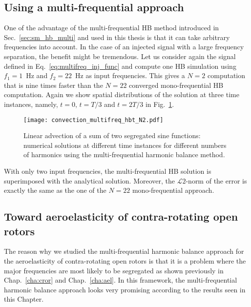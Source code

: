 \subsection{Using a multi-frequential approach}

One of the advantage of the multi-frequential HB method introduced in Sec.~\ref{sec:sm_hb_multi}
and used in this thesis is that it can take arbitrary frequencies into account.
In the case of an injected signal with a large frequency separation, the
benefit might be tremendous. Let us consider again the signal defined in 
Eq.~\eqref{eq:multifreq_inj_func} and compute one HB simulation using 
$f_1=1$~Hz and $f_2=22$~Hz as input frequencies. This gives a $N=2$
computation that is nine times faster than the $N=22$ converged mono-frequential
HB computation.
Again
we show spatial distributions of the solution
at three time instances, namely, $t=0$, $t=T/3$ and $t=2T/3$
in Fig.~\ref{fig:inj_multifreq_hb}.
\begin{figure}[htb]
  \centering
  \texttt{[image: convection\_multifreq\_hbt\_N2.pdf]}
  \caption{Linear advection of a sum of two segregated sine functions: 
  numerical solutions at different time instances for different numbers of harmonics using the
  multi-frequential harmonic balance method.}
  \label{fig:inj_multifreq_hb}
\end{figure}
With only two input frequencies, the multi-frequential
HB solution is superimposed with the analytical solution.
Moreover, the $\mathcal{L}2$-norm of the error is 
exactly the same as the one of the $N=22$ mono-frequential
approach.


\subsection{Toward aeroelasticity of contra-rotating open rotors}
The reason why we studied the multi-frequential harmonic balance
approach for the aeroelasticity of contra-rotating open rotors
is that it is a problem where the major frequencies are most
likely to be segregated as shown previously in Chap.~\ref{cha:cror} and
Chap.~\ref{cha:ael}. In this framework, the multi-frequential
harmonic balance approach looks very promising according to the results
seen in this Chapter.
